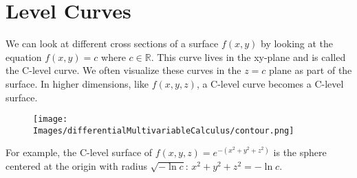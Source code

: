 \section{Level Curves}
\noindent
We can look at different cross sections of a surface $f(x,y)$ by looking at the equation $f(x,y) = c$ where $c \in \mathbb{R}$. This curve lives in the xy-plane and is called the C-level curve. We often visualize these curves in the $z=c$ plane as part of the surface. In higher dimensions, like $f(x,y,z)$, a C-level curve becomes a C-level surface.

\begin{figure}[H]
\centering
\texttt{[image: Images/differentialMultivariableCalculus/contour.png]}
\end{figure}
\noindent
For example, the C-level surface of $f(x,y,z) = e^{-\left(x^2+y^2+z^2\right)}$ is the sphere centered at the origin with radius $\sqrt{-\ln{c}}$: $x^2 + y^2 + z^ 2 =-\ln{c}$.